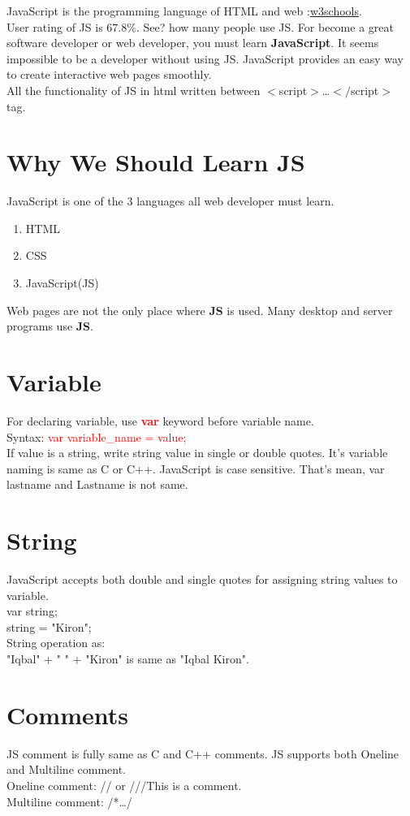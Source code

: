 JavaScript is the programming language of HTML and web :\href{https://www.w3schools.com/js/}{w3schools}.\\
User rating of JS is $67.8\%$. See? how many people use JS. For become a great software developer or web developer, you must learn \textbf{JavaScript}. It seems impossible to be a developer without using JS. JavaScript provides an easy way to create interactive web pages smoothly.\\
All the functionality of JS in html written between $<$script$>$\dots$</$script$>$ tag.
\section{Why We Should Learn JS}
JavaScript is one of the 3 languages all web developer must learn.\\
\begin{enumerate}
 \item HTML
 \item CSS
 \item JavaScript(JS)
\end{enumerate}
Web pages are not the only place where \textbf{JS} is used. Many desktop and server programs use \textbf{JS}.
\section{Variable}
For declaring variable, use \textbf{\textcolor{red}{var}} keyword before variable name.\\
Syntax: \textcolor{red}{var variable\_name = value;}\\
If value is a string, write string value in single or double quotes. It's variable naming is same as C or C++. JavaScript is case sensitive. That's mean, var lastname and Lastname is not same.
\section{String}
JavaScript accepts both double and single quotes for assigning string values to variable.\\
var string;\\
string = "Kiron";\\
String operation as:\\
"Iqbal" + " " + "Kiron" is same as "Iqbal Kiron".
\section{Comments}
JS comment is fully same as C and C++ comments. JS supports both Oneline and Multiline comment.\\
Oneline comment: // or ///This is a comment.\\
Multiline comment: /*\dots*/